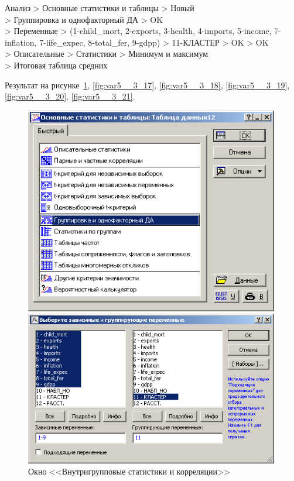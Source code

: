 \newpage

Анализ > Основные статистики и таблицы > Новый\\
> Группировка и однофакторный ДА > OK\\
> Переменные > (1-child\_mort, 2-exports, 3-health, 4-imports, 5-income,
7-inflation, 7-life\_expec, 8-total\_fer, 9-gdpp) > 11-КЛАСТЕР > OK > OK\\
> Описательные > Статистики > Минимум и максимум\\
> Итоговая таблица средних

Результат на рисунке~\ref{fig:var5__3_16}, \ref{fig:var5__3_17}, \ref{fig:var5__3_18}, \ref{fig:var5__3_19}, \ref{fig:var5__3_20}, \ref{fig:var5__3_21}.

\begin{figure}[!h]
  \centering
  \begin{minipage}{0.49\textwidth}
    \centering

    \includegraphics[width=0.99\textwidth]
    {inc/cars_my/var5__3_16.PNG}

    \caption{Окно <<Внутригрупповые статистики и корреляции>>}
    \label{fig:var5__3_16}
  \end{minipage}
  \begin{minipage}{0.49\textwidth}
    \centering

    \includegraphics[width=0.99\textwidth]
    {inc/cars_my/var5__3_17.PNG}


\end{minipage}
\end{figure}
